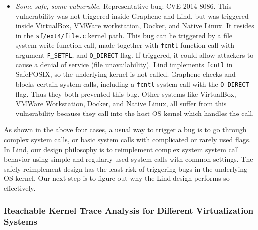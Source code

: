 {\begin{itemize}
\item \emph{Some safe, some vulnerable.}  Representative bug: CVE-2014-8086.
This vulnerability was not triggered inside Graphene and Lind, but was triggered inside
VirtualBox, VMWare workstation, Docker, and Native Linux. It resides in the \texttt{sf/ext4/file.c} kernel path. 
This bug can be triggered by a file system write function call, made together with \texttt{fcntl} function call
with argument \texttt{F\_SETFL}, and \texttt{O\_DIRECT} flag. If triggered, it could allow attackers to cause
a denial of service (file unavailability). Lind implements \texttt{fcntl}
in SafePOSIX, so the underlying kernel is not called.
Graphene checks and blocks certain system calls, including
a \texttt{fcntl} system call with the \texttt{O\_DIRECT} flag.
Thus they both prevented this bug. Other systems like VirtualBox, VMWare Workstation, Docker, and Native Linux,
all suffer from this vulnerability because they call into the host OS
kernel which handles the call.

\end{itemize}

As shown in the above four cases, a usual way to trigger a bug is to go through
complex system calls,
or basic system calls with complicated or rarely used flags. In Lind, our
design philosophy is to reimplement complex system system call behavior
using simple and regularly used system calls with common settings.
The safely-reimplement design
has the least risk of triggering bugs in the underlying OS kernel. Our next step
is to figure out why the Lind design performs so effectively.

\subsubsection{Reachable Kernel Trace Analysis for Different Virtualization
Systems}
\label{Reachable-Kernel-Trace-Analysis-for-Different-Virtualization-Systems}

}
